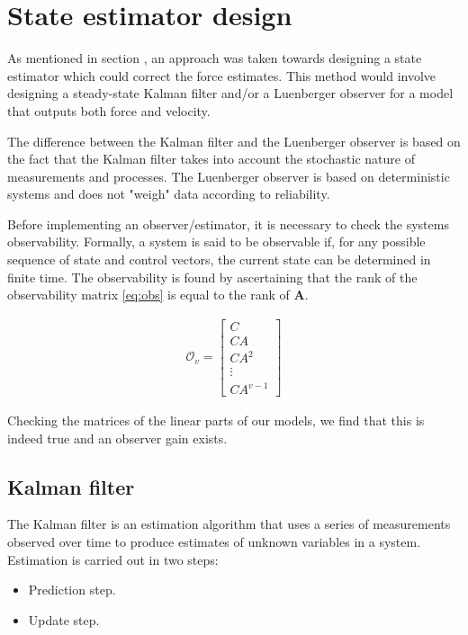 {\section{State estimator design} \label{se:est}
As mentioned in section , an approach was taken towards designing a state estimator which could correct the force estimates.
This method would involve designing a steady-state Kalman filter \cite{brown1997introduction} and/or a Luenberger observer \cite{friedland2012control} for a model that outputs both force and velocity.

The difference between the Kalman filter and the Luenberger observer is based on the fact that the Kalman filter takes into account the stochastic nature of measurements and processes. The Luenberger observer is based on deterministic systems and does not "weigh" data according to reliability.

Before implementing an observer/estimator, it is necessary to check the  systems observability.
Formally, a system is said to be observable if, for any possible sequence of state and control vectors, the current state can be determined in finite time.
The observability is found by ascertaining that the rank of the observability matrix \eqref{eq:obs} is equal to the rank of $\mathbf{A}$.

\begin{align}\label{eq:obs}
\mathcal{O}_v=\begin{bmatrix} C \\ CA \\ CA^2 \\ \vdots \\ CA^{v-1} \end{bmatrix}
\end{align}

Checking the matrices of the linear parts of our models, we find that this is indeed true and an observer gain exists.

\subsection{Kalman filter}
The Kalman filter is an estimation algorithm that uses a series of measurements observed over time to produce estimates of unknown variables in a system.
Estimation is carried out in two steps:

\begin{itemize}
\item Prediction step.
\item Update step.
\end{itemize} 

}
